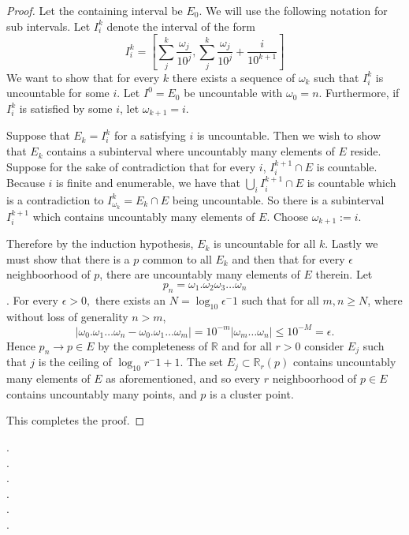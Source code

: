 \documentclass[letter]{article}
\newenvironment{menumerate}{%
  \edef\backupindent{\the\parindent}%
  \enumerate%
  \setlength{\parindent}{\backupindent}%
}{\endenumerate}
\begin{document}
\begin{menumerate}
\begin{proof}
		Let the containing interval be $E_0.$ We will use the following notation for sub intervals. Let $I^k_i$ denote the interval of the form
		 $$I^k_i = \left[ \sum_j^k \frac{\omega_j}{10^j}, \sum_j^k \frac{\omega_j}{10^j}  + \frac{i}{10^{k+1}}\right]$$
		  We want to show that for every $k$ there exists a sequence of $\omega_k$ such that $I^k_i$ is uncountable for some $i.$ Let $I^0 = E_0$ be uncountable with $\omega_0 = n$. Furthermore, if $I^k_i$ is satisfied by some $i$, let $\omega_{k+1} = i.$


		  Suppose that $E_k = I^k_i$ for a satisfying $i$ is uncountable. Then we wish to show that $E_k$ contains a subinterval where uncountably many elements of $E$ reside. Suppose for the sake of contradiction that for every $i$, 
		  $I^{k+1}_i \cap E$ is countable. Because $i$ is finite and enumerable, we have that $ \bigcup_i I^{k+1}_i \cap E$ is countable which is a contradiction to $I^k_{\omega_k} = E_k \cap E$ being uncountable. So there is a subinterval $I^{k+1}_i$ which contains uncountably many elements of $E$. Choose $\omega_{k+1} := i$. 

		  Therefore by the induction hypothesis, $E_k$ is uncountable for all $k$. Lastly we must show that there is a $p$ common to all $E_k$ and then that for every $\epsilon$ neighboorhood of $p$, there are uncountably many elements of $E$ therein. Let $$p_n = \omega_1.\omega_2\omega_3\dots\omega_n$$. For every $\epsilon > 0,$ there exists an $N = \log_{10} \epsilon ^-1$ such that for all $m,n \geq N$, where without loss of generality $n>m$,  $$|\omega_0.\omega_1\dots\omega_n - \omega_0.\omega_1\dots\omega_m| = 10^{-m}|\omega_m\dots\omega_n| \leq 10^{-M} = \epsilon. $$ Hence $p_n \to p \in E$ by the completeness of $\mathbb{R}$ and for all $r > 0$ consider $E_j$ such that $j$ is the ceiling of $\log_{10}r^-1+1$. The set $E_j \subset \mathbb{R}_r(p)$ contains uncountably many elements of $E$ as aforementioned, and so every $r$ neighboorhood of $p \in E$ contains uncountably many points, and $p$ is a cluster point.

		  This completes the proof.
	\end{proof}
	\item
	\item
	\item
	\item 
	\item . \\
	. \\ 
	. \\ 
	 . \\
	 . \\
	 . \\



\end{menumerate}
\end{document}

